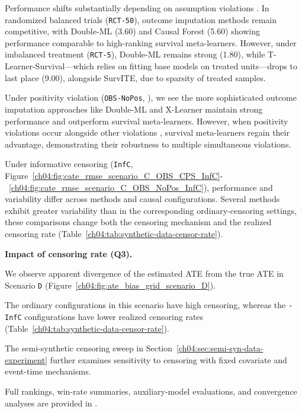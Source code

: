 Performance shifts substantially depending on assumption violations \citep[Appendix F.3, Figure 7]{noroozizadeh2026survhte}.
In randomized balanced trials (\texttt{RCT-50}), outcome imputation methods remain competitive, with Double-ML (3.60) and Causal Forest (5.60) showing performance comparable to high-ranking survival meta-learners.
However, under imbalanced treatment (\texttt{RCT-5}), Double-ML remains strong (1.80), while T-Learner-Survival---which relies on fitting base models on treated units---drops to last place (9.00), alongside SurvITE, due to sparsity of treated samples.

Under positivity violation (\texttt{OBS-NoPos}, \citep[Figure 7e]{noroozizadeh2026survhte}), we see the more sophisticated outcome imputation approaches like Double-ML and X-Learner maintain strong performance and outperform survival meta-learners.
However, when positivity violations occur alongside other violations \citep[Figure 7h]{noroozizadeh2026survhte}, survival meta-learners regain their advantage, demonstrating their robustness to multiple simultaneous violations.

Under informative censoring (\texttt{InfC}, Figure~\ref{ch04:fig:cate_rmse_scenario_C_OBS_CPS_InfC}-~\ref{ch04:fig:cate_rmse_scenario_C_OBS_NoPos_InfC}), performance and variability differ across methods and causal configurations.
Several methods exhibit greater variability than in the corresponding ordinary-censoring settings, these comparisons change both the censoring mechanism and the realized censoring rate (Table~\ref{ch04:tab:synthetic-data-censor-rate}).

\textbf{Impact of censoring rate (Q3).}

We observe apparent divergence of the estimated ATE from the true ATE in Scenario \texttt{D} (Figure~\ref{ch04:fig:ate_bias_grid_scenario_D}).

The ordinary configurations in this scenario have high censoring, whereas the \texttt{-InfC} configurations have lower realized censoring rates (Table~\ref{ch04:tab:synthetic-data-censor-rate}).

The semi-synthetic censoring sweep in Section~\ref{ch04:sec:semi-syn-data-experiment} further examines sensitivity to censoring with fixed covariate and event-time mechanisms.

Full rankings, win-rate summaries, auxiliary-model evaluations, and convergence analyses are provided in \citet[Appendices F.1--F.3 and F.6--F.7]{noroozizadeh2026survhte}.

